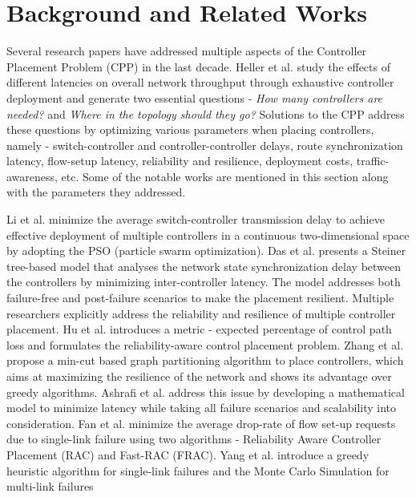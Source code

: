 \documentclass[a4paper,fleqn]{cas-dc}
\begin{document}
\section{Background and Related Works} \label{background}
\noindent Several research papers have addressed multiple aspects of the Controller Placement Problem (CPP) in the last decade. Heller et al. \cite{heller2012latency} study the effects of different latencies on overall network throughput through exhaustive controller deployment and generate two essential questions - \textit{How many controllers are needed?} and \textit{Where in the topology should they go?} Solutions to the CPP address these questions by optimizing various parameters when placing controllers, namely - switch-controller and controller-controller delays, route synchronization latency, flow-setup latency, reliability and resilience, deployment costs, traffic-awareness, etc. Some of the notable works are mentioned in this section along with the parameters they addressed.

Li et al. \cite{li2020latency} minimize the average switch-controller transmission delay to achieve effective deployment of multiple controllers in a continuous two-dimensional space by adopting the PSO (particle swarm optimization). Das et al. \cite{das2020latency} presents a Steiner tree-based model that analyses the network state synchronization delay between the controllers by minimizing inter-controller latency. The model addresses both failure-free and post-failure scenarios to make the placement resilient. Multiple researchers explicitly address the reliability and resilience of multiple controller placement. Hu et al. \cite{hu2013reliability} introduces a metric - expected percentage of control path loss and formulates the reliability-aware control placement problem. Zhang et al. \cite{zhang2011resilience} propose a min-cut based graph partitioning algorithm to place controllers, which aims at maximizing the resilience of the network and shows its advantage over greedy algorithms. Ashrafi et al. \cite{ashrafi2020reliability} address this issue by developing a mathematical model to minimize latency while taking all failure scenarios and scalability into consideration. Fan et al. \cite{fan2020reliability} minimize the average drop-rate of flow set-up requests due to single-link failure using two algorithms - Reliability Aware Controller Placement (RAC) and Fast-RAC (FRAC). Yang et al. \cite{yang2020security} introduce a greedy heuristic algorithm for single-link failures and the Monte Carlo Simulation for multi-link failures
\end{document}
